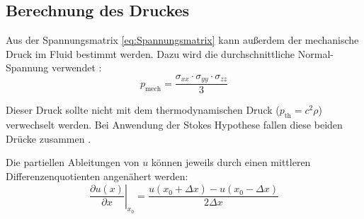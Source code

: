 \documentclass[a4paper,10pt]{scrreprt}
\begin{document}
\subsection{Berechnung des Druckes}
Aus der Spannungsmatrix \eqref{eq:Spannungsmatrix} kann außerdem der mechanische Druck im Fluid bestimmt werden.
Dazu wird die durchschnittliche Normal-Spannung verwendet \cite{Graves1999}:
\begin{equation}
 p_{\text{mech}} = \frac{\sigma_{xx} \cdot \sigma_{yy} \cdot \sigma_{zz}}{3}
\end{equation}

Dieser Druck sollte nicht mit dem thermodynamischen Druck ($p_{\text{th}}=c^2 \rho$) verwechselt werden. Bei Anwendung der Stokes Hypothese fallen diese beiden Drücke zusammen \cite{Graves1999}.

Die partiellen Ableitungen von $u$ können jeweils durch einen mittleren Differenzenquotienten angenähert werden:
\begin{equation}
 \left. \frac{\partial u(x)}{\partial x}\right|_{x_0} = \frac{u(x_0 + \Delta x) - u(x_0 - \Delta x)}{2 \Delta x}
\end{equation}








\printbibliography
\end{document}
